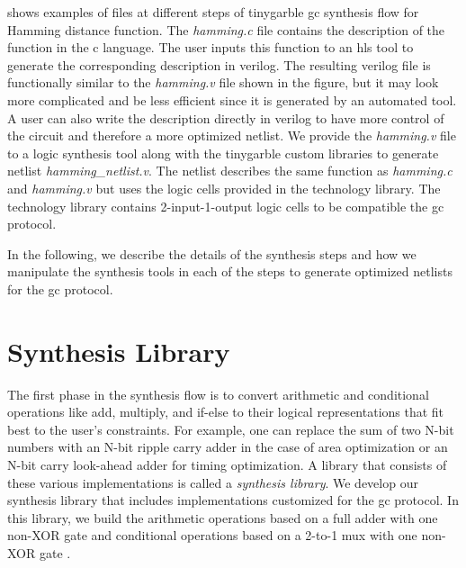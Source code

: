  shows examples of files at different steps of \gls{tinygarble} \acrshort{gc} synthesis flow for Hamming distance function.
The \textsl{hamming.c} file contains the description of the function in the \gls{c} language.
The user inputs this function to an \acrshort{hls} tool to generate the corresponding description in \gls{verilog}.
The resulting \gls{verilog} file is functionally similar to the \textsl{hamming.v} file shown in the figure, but it may look more complicated and be less efficient since it is generated by an automated tool.
A user can also write the description directly in \gls{verilog} to have more control of the circuit and therefore a more optimized \gls{netlist}.
We provide the \textsl{hamming.v} file to a logic synthesis tool along with the \gls{tinygarble} custom libraries to generate \gls{netlist} \textsl{hamming\_netlist.v}.
The \gls{netlist} describes the same function as \textsl{hamming.c} and \textsl{hamming.v} but uses the logic cells provided in the technology library.
The technology library contains 2-input-1-output logic cells to be compatible the \acrshort{gc} protocol.

In the following, we describe the details of the synthesis steps and how we manipulate the synthesis tools in each of the steps to generate optimized \gls{netlist}s for the \acrshort{gc} protocol.

\section{Synthesis Library}\label{sec:syn-synlib}
The first phase in the synthesis flow is to convert arithmetic and conditional operations like add, multiply, and if-else to their logical representations that fit best to the user's constraints.
For example, one can replace the sum of two N-bit numbers with an N-bit ripple carry adder in the case of area optimization or an N-bit carry look-ahead adder for timing optimization.
A library that consists of these various implementations is called a \emph{synthesis library}.
We develop our synthesis library that includes implementations customized for the \acrshort{gc} protocol.
In this library, we build the arithmetic operations based on a full adder with one non-XOR gate \cite{boyar2006concrete} and conditional operations based on a 2-to-1 \acrfull{mux} with one non-XOR gate \cite{kolesnikov2008improved}.

